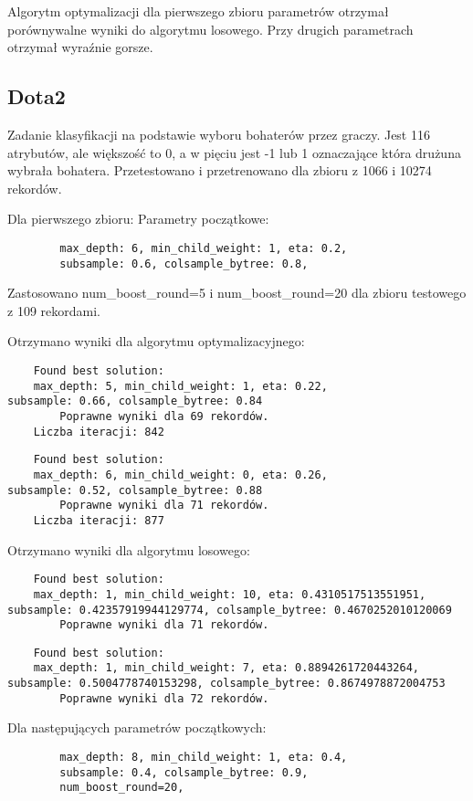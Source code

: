 \documentclass[a4paper,12p]{article}
\begin{document}
	Algorytm optymalizacji dla pierwszego zbioru parametrów otrzymał porównywalne wyniki do algorytmu losowego. Przy drugich parametrach otrzymał wyraźnie gorsze.
	
	\subsection{Dota2}
	Zadanie klasyfikacji na podstawie wyboru bohaterów przez graczy. Jest 116 atrybutów, ale większość to 0, a w pięciu jest -1 lub 1 oznaczające która drużuna wybrała bohatera. Przetestowano i przetrenowano dla zbioru z 1066 i 10274 rekordów.

	Dla pierwszego zbioru:
	Parametry początkowe:
	\begin{verbatim}
		max_depth: 6, min_child_weight: 1, eta: 0.2,
		subsample: 0.6, colsample_bytree: 0.8,	
	\end{verbatim}
	Zastosowano num_boost_round=5 i num_boost_round=20 dla zbioru testowego z 109 rekordami.
	
	Otrzymano wyniki dla algorytmu optymalizacyjnego:
	\begin{verbatim}
	Found best solution:
	max_depth: 5, min_child_weight: 1, eta: 0.22,
subsample: 0.66, colsample_bytree: 0.84
        Poprawne wyniki dla 69 rekordów.
	Liczba iteracji: 842
	\end{verbatim}
	
	\begin{verbatim}
	Found best solution:
	max_depth: 6, min_child_weight: 0, eta: 0.26,
subsample: 0.52, colsample_bytree: 0.88
        Poprawne wyniki dla 71 rekordów.
	Liczba iteracji: 877
	\end{verbatim}
	
	Otrzymano wyniki dla algorytmu losowego:
	\begin{verbatim}
	Found best solution:
	max_depth: 1, min_child_weight: 10, eta: 0.4310517513551951,
subsample: 0.42357919944129774, colsample_bytree: 0.4670252010120069
        Poprawne wyniki dla 71 rekordów.
	\end{verbatim}
	\begin{verbatim}
	Found best solution:
	max_depth: 1, min_child_weight: 7, eta: 0.8894261720443264,
subsample: 0.5004778740153298, colsample_bytree: 0.8674978872004753
        Poprawne wyniki dla 72 rekordów.
	\end{verbatim}
	
	Dla następujących parametrów początkowych:
	\begin{verbatim}
		max_depth: 8, min_child_weight: 1, eta: 0.4,
		subsample: 0.4, colsample_bytree: 0.9,	
		num_boost_round=20,
	\end{verbatim}
	
\end{document}
